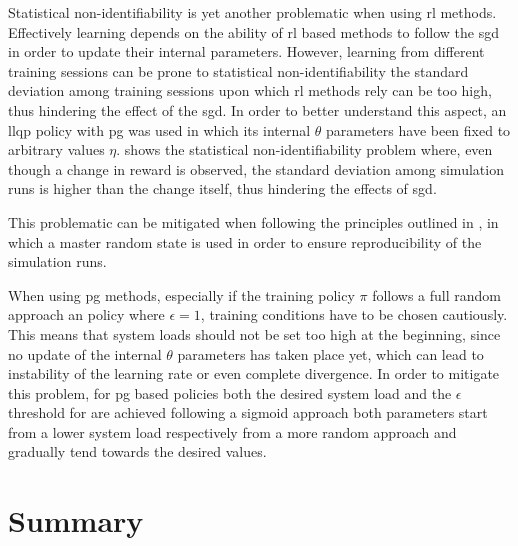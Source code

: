 Statistical non-identifiability is yet another problematic when using \gls{rl} methods. Effectively learning depends on the ability of \gls{rl} based methods to follow the \gls{sgd} in order to update their internal parameters. However, learning from different training sessions can be prone to statistical non-identifiability \ie the standard deviation among training sessions upon which \gls{rl} methods rely can be too high, thus hindering the effect of the \gls{sgd}. In order to better understand this aspect, an \gls{llqp} policy with \gls{pg} was used in which its internal $\theta$ parameters have been fixed to arbitrary values $\eta$.  shows the statistical non-identifiability problem where, even though a change in reward is observed, the standard deviation among simulation runs is higher than the change itself, thus hindering the effects of \gls{sgd}.


This problematic can be mitigated when following the principles outlined in , in which a master random state is used in order to ensure reproducibility of the simulation runs.

When using \gls{pg} methods, especially if the training policy $\pi$ follows a full random approach \ie an  policy where $\epsilon=1$, training conditions have to be chosen cautiously. This means that system loads should not be set too high at the beginning, since no update of the internal $\theta$ parameters has taken place yet, which can lead to instability of the learning rate or even complete divergence. In order to mitigate this problem, for \gls{pg} based policies both the desired system load and the $\epsilon$ threshold for  are achieved following a sigmoid approach \ie both parameters start from a lower system load respectively from a more random approach and gradually tend towards the desired values.

\section{Summary}
\label{sec:summary}

